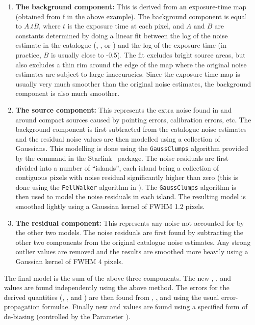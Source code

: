 \begin{enumerate}
\item {\bf The background component:} This is derived from an exposure-time
map (obtained from f in the above example). The background
component is equal to $A.tB$, where $t$ is the exposure time at each pixel,
and $A$ and $B$ are constants determined by doing a linear fit between the log
of the noise estimate in the catalogue (, , or ) and the log of the
exposure time (in practice, $B$ is usually close to -0.5). The fit excludes
bright source areas, but also excludes a thin rim around the edge of the map
where the original noise estimates are subject to large inaccuracies. Since
the exposure-time map is usually very much smoother than the original noise
estimates, the background component is also much smoother. \item {\bf The
source component:} This represents the extra noise found in and around compact
sources caused by pointing errors, calibration errors, etc. The background
component is first subtracted from the catalogue noise estimates and the
residual noise values are then modelled using a collection of Gaussians. This
modelling is done using the \texttt{GaussClumps} algorithm provided by the
 command in the Starlink \cupid\ package. The noise residuals
are first divided into a number of ``islands'', each island being a collection
of contiguous pixels with noise residual significantly higher than zero (this
is done using the \texttt{FellWalker} algorithm in \cupid). The
\texttt{GaussClumps} algorithm is then used to model the noise residuals in
each island. The resulting model is smoothed lightly using a Gaussian kernel
of FWHM 1.2 pixels.

\item {\bf The residual component:} This represents any noise not accounted
for by the other two models. The noise residuals are first found by
subtracting the other two components from the original catalogue noise
estimates. Any strong outlier values are removed and the results are smoothed
more heavily using a Gaussian kernel of FWHM 4 pixels.
\end{enumerate}

The final model is the sum of the above three components. The new
, , and
 values are found independently using the above method. The errors for the
derived quantities (, , and ) are then found
from , , and  using the usual error-propagation
formulae. Finally new  and  values are found
using a specified form of de-biasing (controlled by the Parameter
).


